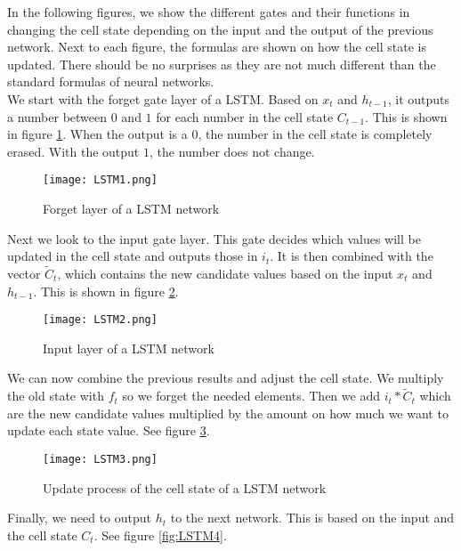 In the following figures, we show the different gates and their functions in changing the cell state depending on the input and the output of the previous network. Next to each figure, the formulas are shown on how the cell state is updated. There should be no surprises as they are not much different than the standard formulas of neural networks. \\

We start with the forget gate layer of a LSTM. Based on $x_t$ and $h_{t-1}$, it outputs a number between $0$ and $1$ for each number in the cell state $C_{t-1}$. This is shown in figure \ref{fig:LSTM1}. When the output is a $0$, the number in the cell state is completely erased. With the output $1$, the number does not change. \\

\begin{figure}[!htb]
	\centering
	\texttt{[image: LSTM1.png]}
	\caption{Forget layer of a LSTM network \cite{lstmGood:online}}
	\label{fig:LSTM1}
\end{figure} 

Next we look to the input gate layer. This gate decides which values will be updated in the cell state and outputs those in $i_t$. It is then combined with the vector $\widetilde{C}_t$, which contains the new candidate values based on the input $x_t$ and $h_{t-1}$. This is shown in figure \ref{fig:LSTM2}. \\

\begin{figure}[!htb]
	\centering
	\texttt{[image: LSTM2.png]}
	\caption{Input layer of a LSTM network \cite{lstmGood:online}}
	\label{fig:LSTM2}
\end{figure} 

We can now combine the previous results and adjust the cell state. We multiply the old state with $f_t$ so we forget the needed elements. Then we add $i_t*\widetilde{C}_t$ which are the new candidate values multiplied by the amount on how much we want to update each state value. See figure \ref{fig:LSTM3}. \\

\begin{figure}[!htb]
	\centering
	\texttt{[image: LSTM3.png]}
	\caption{Update process of the cell state of a LSTM network \cite{lstmGood:online}}
	\label{fig:LSTM3}
\end{figure} 

Finally, we need to output $h_t$ to the next network. This is based on the input and the cell state $C_t$. See figure \ref{fig:LSTM4}. \\

